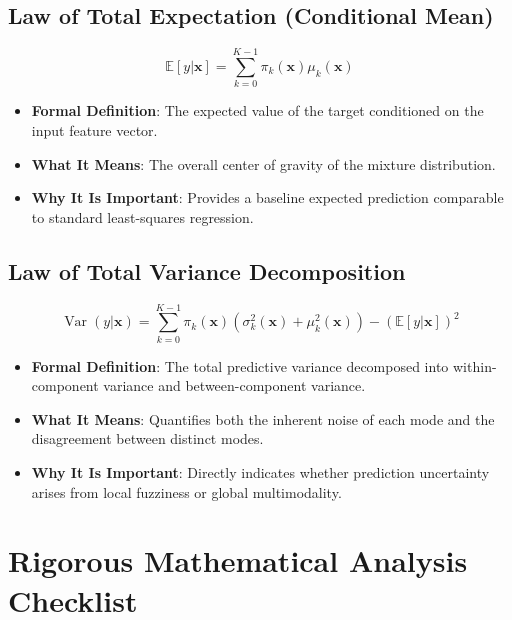 \documentclass[11pt,a4paper]{article}
\theoremstyle{definition}
\begin{document}
\subsection{Law of Total Expectation (Conditional Mean)}
{\boldmath
\begin{equation}
\mathbb{E}[y | \mathbf{x}] = \sum_{k=0}^{K-1} \pi_k(\mathbf{x}) \mu_k(\mathbf{x})
\end{equation}
}
\begin{itemize}
    \item \textbf{Formal Definition}: The expected value of the target conditioned on the input feature vector.
    \item \textbf{What It Means}: The overall center of gravity of the mixture distribution.
    \item \textbf{Why It Is Important}: Provides a baseline expected prediction comparable to standard least-squares regression.
\end{itemize}

\subsection{Law of Total Variance Decomposition}
{\boldmath
\begin{equation}
\operatorname{Var}(y | \mathbf{x}) = \sum_{k=0}^{K-1} \pi_k(\mathbf{x}) \left( \sigma_k^2(\mathbf{x}) + \mu_k^2(\mathbf{x}) \right) - \left( \mathbb{E}[y | \mathbf{x}] \right)^2
\end{equation}
}
\begin{itemize}
    \item \textbf{Formal Definition}: The total predictive variance decomposed into within-component variance and between-component variance.
    \item \textbf{What It Means}: Quantifies both the inherent noise of each mode and the disagreement between distinct modes.
    \item \textbf{Why It Is Important}: Directly indicates whether prediction uncertainty arises from local fuzziness or global multimodality.
\end{itemize}

\section{Rigorous Mathematical Analysis Checklist}
\end{document}
